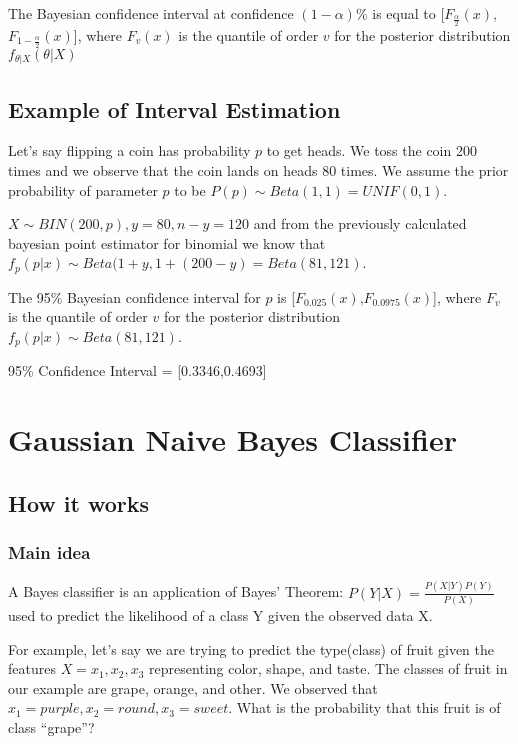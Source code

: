 \documentclass{article}
\begin{document}
The Bayesian confidence interval at confidence $(1-\alpha)$\% is equal to [$F_{\frac{\alpha}{2}}(x)$,$F_{1-\frac{\alpha}{2}}(x)$], where $F_{v}(x)$ is the quantile of order $v$ for the posterior distribution $f_{\theta|X}(\theta|X)$

\subsection{Example of Interval Estimation}

Let's say flipping a coin has probability $p$ to get heads. We toss the coin 200 times and we observe that the coin lands on heads 80 times. We assume the prior probability of parameter $p$ to be $P(p) \sim Beta(1,1) = UNIF(0,1)$.\newline

$X \sim BIN(200,p), y = 80, n-y = 120$ and from the previously calculated bayesian point estimator for binomial we know that $f_{p}(p|x) \sim Beta(1+y, 1+(200-y) = Beta(81,121)$.

The 95\% Bayesian confidence interval for $p$ is [$F_{0.025}(x)$,$F_{0.0975}(x)$], where $F_{v}$ is the quantile of order $v$ for the posterior distribution $f_{p}(p|x) \sim Beta(81,121)$.\newline

95\% Confidence Interval = [0.3346,0.4693]

\newpage
\section{Gaussian Naive Bayes Classifier}

\subsection{How it works}
\subsubsection{Main idea}
A Bayes classifier is an application of Bayes' Theorem: $P(Y|X) = \frac{P(X|Y)P(Y)}{P(X)}$ used to predict the likelihood of a class Y given the observed data X.\newline

For example, let's say we are trying to predict the type(class) of fruit given the features $X = x_{1},x_{2},x_{3}$ representing color, shape, and taste. The classes of fruit in our example are grape, orange, and other. We observed that $x_{1} = purple, x_{2} = round, x_{3} = sweet$. What is the probability that this fruit is of class ``grape''?\newline
\end{document}
